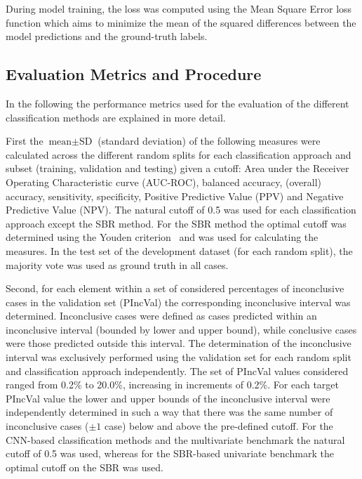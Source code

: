 During model training, the loss was computed using the Mean Square Error loss function 
which aims to minimize the mean of the squared differences between the model predictions and the ground-truth labels.

\subsection{Evaluation Metrics and Procedure}
\label{subsec:eval_metrics_proced}

In the following the performance metrics used for the evaluation of the different classification methods 
are explained in more detail.

First the $\text{mean} \pm \text{SD}$ (standard deviation) of the following measures were calculated across
the different random splits for each classification approach and subset (training, validation and testing) given a cutoff: 
Area under the Receiver Operating Characteristic curve (AUC-ROC), 
balanced accuracy, (overall) accuracy, sensitivity, specificity, 
Positive Predictive Value (PPV) and Negative Predictive Value (NPV).
The natural cutoff of 0.5 was used for each classification approach except the SBR method.
For the SBR method the optimal cutoff was determined using the Youden criterion~\citep{Youden1950} and was used for
calculating the measures.
In the test set of the development dataset (for each random split),
the majority vote was used as ground truth in all cases.

Second, for each element within a set of considered percentages of inconclusive cases in the validation set (PIncVal)
the corresponding inconclusive interval was determined.
Inconclusive cases were defined as cases predicted within an inconclusive interval 
(bounded by lower and upper bound), while conclusive cases were those predicted outside this interval.
The determination of the inconclusive interval was exclusively performed using the validation set 
for each random split and classification approach independently.
The set of PIncVal values considered ranged from 0.2\% to 20.0\%, increasing in increments of 0.2\%.
For each target PIncVal value the lower and upper bounds of the inconclusive interval 
were independently determined in such a way that there was the same number of inconclusive cases ($\pm 1$ case) 
below and above the pre-defined cutoff.
For the CNN-based classification methods and the multivariate benchmark the natural cutoff of 0.5 was used,
whereas for the SBR-based univariate benchmark the optimal cutoff on the SBR was used.


